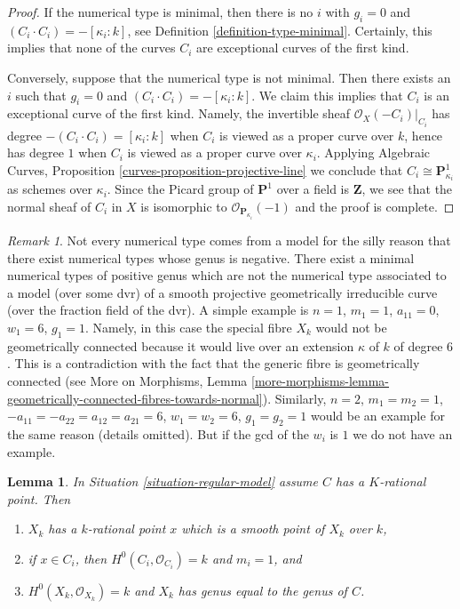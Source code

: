 \documentclass{stacks-project}
\theoremstyle{plain}
\newtheorem{lemma}[subsection]{Lemma}
\theoremstyle{definition}
\theoremstyle{remark}
\newtheorem{remark}[subsection]{Remark}
\numberwithin{equation}{subsection}
\begin{document}
\begin{proof}
If the numerical type is minimal, then there is no $i$ with
$g_i = 0$ and $(C_i \cdot C_i) = -[\kappa_i: k]$, see
Definition \ref{definition-type-minimal}.
Certainly, this implies that none of the curves $C_i$
are exceptional curves of the first kind.

\medskip\noindent
Conversely, suppose that the numerical type is not minimal.
Then there exists an $i$ such that $g_i = 0$ and
$(C_i \cdot C_i) = -[\kappa_i: k]$.
We claim this implies that $C_i$ is an exceptional curve
of the first kind. Namely, the invertible sheaf
$\mathcal{O}_X(-C_i)|_{C_i}$ has degree $-(C_i \cdot C_i) = [\kappa_i : k]$
when $C_i$ is viewed as a proper curve over $k$, hence
has degree $1$ when $C_i$ is viewed as a proper curve over $\kappa_i$.
Applying
Algebraic Curves, Proposition \ref{curves-proposition-projective-line}
we conclude that $C_i \cong \mathbf{P}^1_{\kappa_i}$ as schemes
over $\kappa_i$. Since the Picard group of $\mathbf{P}^1$
over a field is $\mathbf{Z}$, we see that the normal sheaf
of $C_i$ in $X$ is isomorphic to $\mathcal{O}_{\mathbf{P}_{\kappa_i}}(-1)$
and the proof is complete.
\end{proof}

\begin{remark}
\label{remark-numerical-type-not-from-model}
Not every numerical type comes from a model for the silly reason
that there exist numerical types whose genus is negative.
There exist a minimal numerical types of positive genus which
are not the numerical type associated to a model (over some dvr)
of a smooth projective geometrically irreducible curve (over the
fraction field of the dvr). A simple example is
$n = 1$, $m_1 = 1$, $a_{11} = 0$, $w_1 = 6$, $g_1 = 1$.
Namely, in this case the special fibre $X_k$ would not be
geometrically connected because it would live over an extension
$\kappa$ of $k$ of degree $6$. This is a contradiction with the
fact that the generic fibre is geometrically connected (see
More on Morphisms, Lemma
\ref{more-morphisms-lemma-geometrically-connected-fibres-towards-normal}).
Similarly, $n = 2$, $m_1 = m_2 = 1$, $-a_{11} = -a_{22} = a_{12} = a_{21} = 6$,
$w_1 = w_2 = 6$, $g_1 = g_2 = 1$ would be an example
for the same reason (details omitted). But if the gcd of
the $w_i$ is $1$ we do not have an example.
\end{remark}

\begin{lemma}
\label{lemma-numerical-type-rational-point}
In Situation \ref{situation-regular-model} assume $C$ has a $K$-rational point.
Then
\begin{enumerate}
\item $X_k$ has a $k$-rational point $x$ which is a smooth point of $X_k$
over $k$,
\item if $x \in C_i$, then $H^0(C_i, \mathcal{O}_{C_i}) = k$ and
$m_i = 1$, and
\item $H^0(X_k, \mathcal{O}_{X_k}) = k$ and $X_k$ has genus equal to
the genus of $C$.
\end{enumerate}
\end{lemma}
\end{document}
